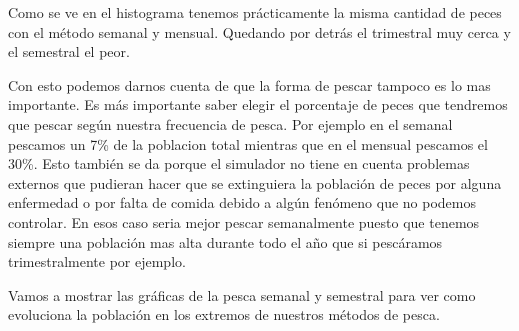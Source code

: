 \documentclass[]{article}
\begin{document}
Como se ve en el histograma tenemos prácticamente la misma cantidad de peces con el método semanal y mensual. Quedando por detrás el trimestral muy cerca y el semestral el peor.


Con esto podemos darnos cuenta de que la forma de pescar tampoco es lo mas importante. Es más importante saber elegir el porcentaje de peces que tendremos que pescar según nuestra frecuencia de pesca. Por ejemplo en el semanal pescamos un 7\% de la poblacion total mientras que en el mensual pescamos el 30\%. Esto también se da porque el simulador no tiene en cuenta problemas externos que pudieran hacer que se extinguiera la población de peces por alguna enfermedad o por falta de comida debido a algún fenómeno que no podemos controlar. En esos caso seria mejor pescar semanalmente puesto que tenemos siempre una población mas alta durante todo el año que si pescáramos trimestralmente por ejemplo.


Vamos a mostrar las gráficas de la pesca semanal y semestral para ver como evoluciona la población en los extremos de nuestros métodos de pesca.
\end{document}
